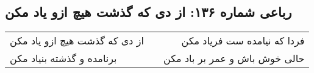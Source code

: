 \begin{center}
\section*{رباعی شماره ۱۳۶: از دی که گذشت هیچ ازو یاد مکن}
\label{sec:sh136}
\begin{longtable}{l p{0.5cm} r}
از دی که گذشت هیچ ازو یاد مکن
&&
فردا که نیامده ست فریاد مکن
\\
برنامده و گذشته بنیاد مکن
&&
حالی خوش باش و عمر بر باد مکن
\\
\end{longtable}
\end{center}
